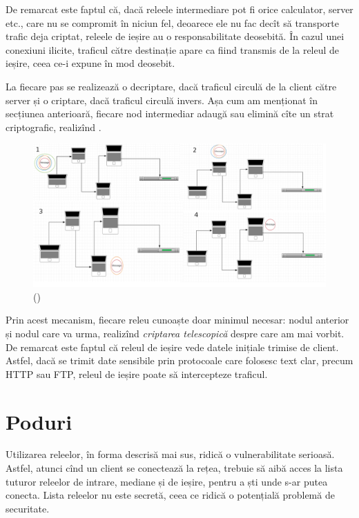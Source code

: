 De remarcat este faptul că, dacă releele intermediare pot fi orice calculator, server
etc., care nu se compromit în niciun fel, deoarece ele nu fac decît să transporte
trafic deja criptat, releele de ieșire au o responsabilitate deosebită. În cazul unei
conexiuni ilicite, traficul către destinație apare ca fiind transmis de la releul
de ieșire, ceea ce-i expune în mod deosebit.

La fiecare pas se realizează o decriptare, dacă traficul circulă de la client către
server și o criptare, dacă traficul circulă invers. Așa cum am menționat în secțiunea
anterioară, fiecare nod intermediar adaugă sau elimină cîte un strat criptografic,
realizînd .

\begin{figure}[!htbp]
  \centering
  \includegraphics{fig/4onions.png}
  \caption{ (\cite{bs})}
  \label{fig:4on}
\end{figure}


Prin acest mecanism, fiecare releu cunoaște doar minimul necesar: nodul anterior și
nodul care va urma, realizînd \emph{criptarea telescopică} despre care am mai vorbit.
De remarcat este faptul că releul de ieșire vede datele inițiale trimise de client.
Astfel, dacă se trimit date sensibile prin protocoale care folosesc text clar, precum
HTTP sau FTP, releul de ieșire poate să intercepteze traficul.


\section{Poduri} 

\indent\indent Utilizarea releelor, în forma descrisă mai sus, ridică o vulnerabilitate
serioasă. Astfel, atunci cînd un client se conectează la rețea, trebuie să aibă acces
la lista tuturor releelor de intrare, mediane și de ieșire, pentru a ști unde s-ar putea
conecta. Lista releelor nu este secretă, ceea ce ridică o potențială problemă de securitate.

